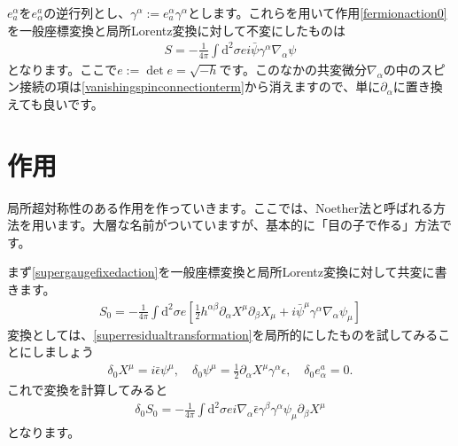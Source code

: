 \documentclass[report,paper=a4, fontsize=12pt, line_length=16cm, number_of_lines=33,dvipdfmx]{jlreq}
\numberwithin{equation}{chapter}
\numberwithin{equation}{section}
\newcommand{\del}{\partial}
\newcommand{\di}{\mathrm{d}}
\newcommand{\psib}{\bar{\psi}}
\newcommand{\epsilonb}{\bar{\epsilon}}
\begin{document}
$e_{a}^{\alpha}$を$e^{a}_{\alpha}$の逆行列とし、$\gamma^{\alpha}:=e^{\alpha}_{a}\gamma^{\alpha}$とします。これらを用いて作用\eqref{fermionaction0}を一般座標変換と局所Lorentz変換に対して不変にしたものは
\begin{align}
  S=-\frac{1}{4\pi}\int \di^2 \sigma e i\psib \gamma^{\alpha}\nabla_{\alpha}\psi
\end{align}
となります。ここで$e:=\det e=\sqrt{-h}$です。このなかの共変微分$\nabla_{\alpha}$の中のスピン接続の項は\eqref{vanishingspinconnectionterm}から消えますので、単に$\del_{\alpha}$に置き換えても良いです。

\section{作用}
局所超対称性のある作用を作っていきます。ここでは、Noether法と呼ばれる方法を用います。大層な名前がついていますが、基本的に「目の子で作る」方法です。

まず\eqref{supergaugefixedaction}を一般座標変換と局所Lorentz変換に対して共変に書きます。
\begin{align}
  S_0=-\frac{1}{4\pi}\int \di^2\sigma e\left[ 
    \frac12 h^{\alpha\beta}\del_{\alpha}X^{\mu}\del_{\beta}X_{\mu}
    +i\psib^{\mu}\gamma^{\alpha}\nabla_{\alpha}\psi_{\mu}
   \right]
\end{align}
変換としては、\eqref{superresidualtransformation}を局所的にしたものを試してみることにしましょう
\begin{align}
  \delta_{0}X^{\mu}=i\epsilonb \psi^{\mu},\quad
  \delta_{0}\psi^{\mu}=\frac12 \del_{\alpha}X^{\mu}\gamma^{\alpha}\epsilon,\quad
  \delta_{0}e^{a}_{\alpha}=0.
\end{align}
これで変換を計算してみると
\begin{align}
  \delta_{0}S_{0}=-\frac{1}{4\pi}\int \di^2 \sigma e i
  \nabla_{\alpha}\epsilonb\gamma^{\beta}\gamma^{\alpha}\psi_{\mu}\del_{\beta}X^{\mu}\label{tempdelta0S0}
\end{align}
となります。
\end{document}
